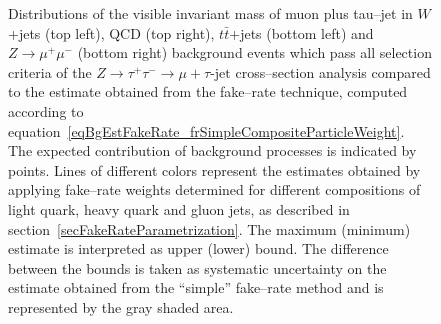 \begin{figure}[t]
\begin{center}
\begin{picture}
\end{picture}
\caption{\captiontext Distributions of the visible invariant mass of muon plus tau--jet in
	 $W$+jets (top left), QCD (top right), $t\bar{t}$+jets (bottom left) 
         and $Z \rightarrow \mu^{+} \mu^{-}$ (bottom right) background events which pass all selection criteria 
         of the $Z \rightarrow \tau^{+} \tau^{-} \rightarrow \mu + \tau\mbox{-jet}$ cross--section analysis
	 compared to the estimate obtained from the fake--rate technique, 
         computed according to equation~\ref{eqBgEstFakeRate_frSimpleCompositeParticleWeight}.
	 The expected contribution of background processes is indicated by points.
	 Lines of different colors represent the estimates obtained by applying 
         fake--rate weights determined for different compositions of light quark, heavy quark and gluon jets,
         as described in section~\ref{secFakeRateParametrization}.
	 The maximum (minimum) estimate is interpreted as upper (lower) bound.
	 The difference between the bounds is taken as systematic uncertainty on the estimate 
         obtained from the ``simple'' fake--rate method and is represented by the gray shaded area.}
\label{figBgEstFakeRate_frSimpleResults_mVisible}
\end{center}
\end{figure} 


